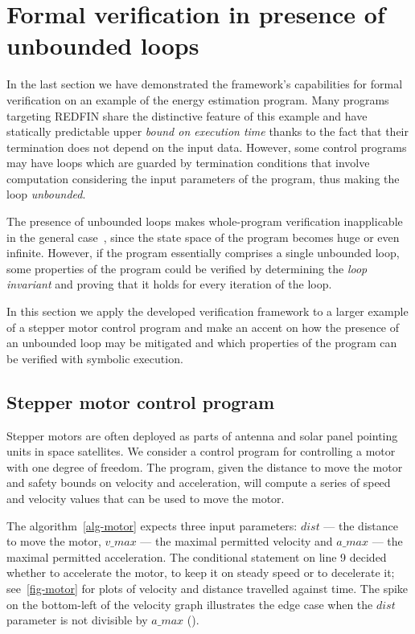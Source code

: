 \section{Formal verification in presence of unbounded loops\label{sec-motor-control}}

In the last section we have demonstrated the framework's capabilities for
formal verification on an example of the energy estimation program.
Many programs targeting REDFIN share the distinctive feature of
this example and have statically predictable upper \emph{bound on execution time}
thanks to the fact that their termination does not
depend on the input data. However, some control programs may have loops
which are guarded by termination conditions that involve computation
considering the input parameters of the program, thus making the loop
\emph{unbounded}.

The presence of unbounded loops makes whole-program
verification inapplicable in the general case~\cite{some-paper-on-symexec},
since the state space of the program becomes huge or even infinite. However,
if the program essentially comprises a single unbounded loop, some properties
of the program could be verified by determining the \emph{loop invariant}
and proving that it holds for every iteration of the loop.

In this section we apply the developed verification framework to a larger
example of a stepper motor control program and make an accent on how
the presence of an unbounded loop may be mitigated and which properties
of the program can be verified with symbolic execution.

\subsection{Stepper motor control program}

Stepper motors are often deployed as parts of antenna and solar panel pointing units
in space satellites. We consider a control program for controlling a motor with
one degree of freedom. The program, given the distance to move the motor and safety
bounds on velocity and acceleration, will compute a series of speed and velocity values
that can be used to move the motor.

The algorithm~\ref{alg-motor} expects three input
parameters: $dist$ --- the distance to move the motor, $v\_max$ --- the maximal permitted
velocity and $a\_max$ --- the maximal permitted acceleration. The conditional statement on
line 9 decided whether to accelerate the motor, to keep it on steady speed or to decelerate
it; see~\ref{fig-motor} for plots of velocity and distance travelled against time. The
spike on the bottom-left of the velocity graph illustrates the edge case when the $dist$
parameter is not divisible by $a\_max$ ().

